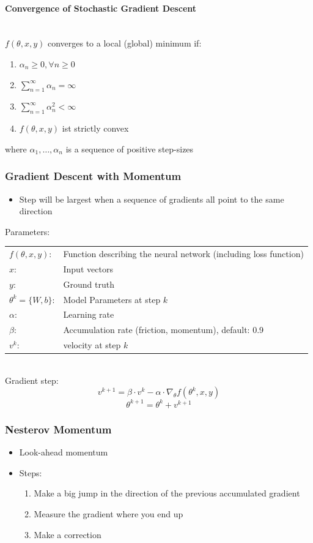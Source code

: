 \documentclass[10pt,a4paper]{article}
\begin{document}
\paragraph{Convergence of Stochastic Gradient Descent} ~\\
$f(\theta, x, y)$ converges to a local (global) minimum if:
\begin{enumerate}
	\item $\alpha_n ≥ 0, \forall n ≥ 0$
	\item $\sum_{n = 1}^∞ \alpha_n = ∞$
	\item $\sum_{n = 1}^∞ \alpha_n^2 < ∞$
	\item $f(\theta, x, y)$ ist strictly convex
\end{enumerate}
where $\alpha_1, \dots, \alpha_n$ is a sequence of positive step-sizes

\subsubsection{Gradient Descent with Momentum}
\begin{itemize}
	\item Step will be largest when a sequence of gradients all point to the same direction
\end{itemize}

Parameters: \\
\begin{tabular}{ll}
	$f(\theta, x, y)$: & Function describing the neural network (including loss function) \\
	$x$: & Input vectors \\
	$y$: & Ground truth \\
	$\theta^k = \{W, b\}$: & Model Parameters at step $k$\\
	$\alpha$: & Learning rate \\
	$\beta$: & Accumulation rate (friction, momentum), default: 0.9 \\
	$v^k$: & velocity at step $k$ \\
\end{tabular} \\

Gradient step:
$$
	v^{k + 1} = \beta ⋅ v^k - \alpha ⋅ \nabla_\theta f(\theta^k, x, y)
$$
$$
	\theta^{k + 1} = \theta^k + v^{k + 1}
$$

\subsubsection{Nesterov Momentum}
\begin{itemize}
	\item Look-ahead momentum
	\item Steps:
	\begin{enumerate}
		\item Make a big jump in the direction of the previous accumulated gradient
		\item Measure the gradient where you end up
		\item Make a correction
	\end{enumerate}
\end{itemize}
\end{document}
